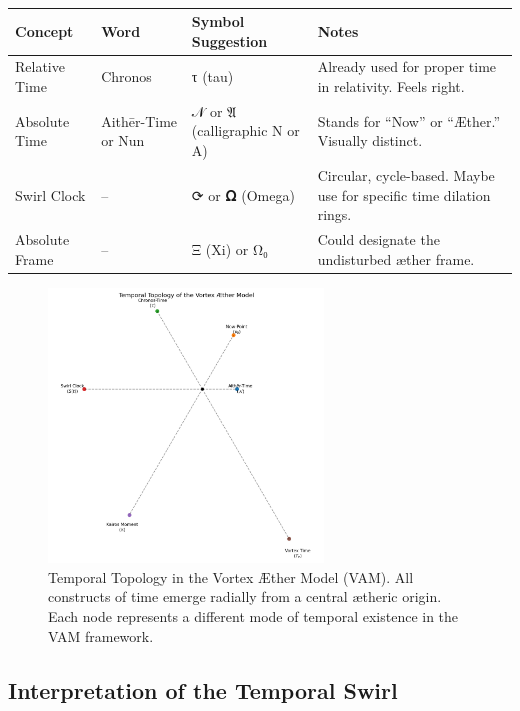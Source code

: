 \documentclass[12pt]{article}
\begin{document}
\begin{table}
    \centering
    \begin{tabular}{llll}
        \toprule
        \textbf{Concept} & \textbf{Word} & \textbf{Symbol Suggestion} & \textbf{Notes} \\
        \midrule
        Relative Time & Chronos & τ (tau) & Already used for proper time in relativity. Feels right. \\
        Absolute Time & Aithēr-Time or Nun & 𝒩 or 𝔄 (calligraphic N or A) & Stands for “Now” or “Æther.” Visually distinct. \\
        Swirl Clock & – & ⟳ or 𝛀 (Omega) & Circular, cycle-based. Maybe use for specific time dilation rings. \\
        Absolute Frame & – & Ξ (Xi) or Ω₀ & Could designate the undisturbed æther frame. \\
        \bottomrule
    \end{tabular}
    \caption{}
    \label{tab:}
\end{table}

    \begin{figure}[h!]
        \centering
        \includegraphics[width=0.65\textwidth]{TimeConstruct} %
        \caption{Temporal Topology in the Vortex Æther Model (VAM). All constructs of time emerge radially from a central ætheric origin. Each node represents a different mode of temporal existence in the VAM framework.}
        \label{fig:VAM-time-swirl}
    \end{figure}

    \subsection*{Interpretation of the Temporal Swirl}
\end{document}
